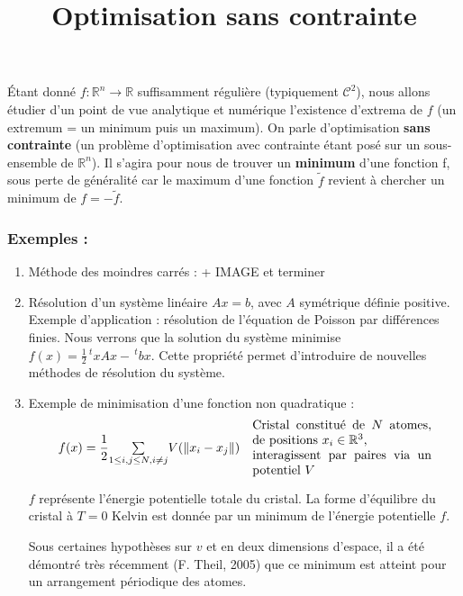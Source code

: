 \documentclass[a4paper,11pt]{article}
\title{\huge \bfseries Optimisation sans contrainte}
\date{}
\author{}
\newcommand{\R}{\mathbb{R}}
\newcommand{\norm}[1]{\left\lVert#1\right\rVert}
\newcommand{\tpo}[1]{\,^t#1}
\theoremstyle{plain} %
\begin{document}
\maketitle

Étant donné $f : \R^n \longrightarrow \R$ suffisamment régulière (typiquement
$\mathcal{C}^2$), nous allons étudier d'un point de vue analytique et
numérique l'existence d'extrema de $f$ (un extremum = un minimum puis un
maximum). On parle d'optimisation \textbf{sans contrainte} (un problème 
d'optimisation avec contrainte étant posé sur un sous-ensemble de $\R^n$).
Il s'agira pour nous de trouver un \textbf{minimum} d'une fonction f, sous perte
de généralité car le maximum d'une fonction $\tilde{f}$ revient à chercher
un minimum de $f = - \tilde{f}$.

\subsubsection*{Exemples :}

\begin{enumerate}[label=-]
    \item Méthode des moindres carrés : 
        + IMAGE
        et terminer

    \item Résolution d'un système linéaire $Ax=b$, avec $A$ symétrique définie
        positive. Exemple d'application : résolution de l'équation de Poisson
        par différences finies. Nous verrons que la solution du système
        minimise $f(x) = \frac{1}{2} \tpo{x}Ax - \tpo{b}x$. Cette propriété
        permet d'introduire de nouvelles méthodes de résolution du système.

    \item Exemple de minimisation d'une fonction non quadratique :
        \[
            \begin{array}{cc}
                f(x) = \dfrac{1}{2} \underset{1\leq i,j\leq N, i\ne j}{\sum} V(\norm{x_i - x_j}) 
                & 
                \parbox{5cm}{Cristal constitué de $N$ atomes, de positions $x_i \in \R^3$,\\ interagissent par paires via un potentiel $V$}
            \end{array}
        \]
        
        $f$ représente l'énergie potentielle totale du cristal. La forme d'équilibre du
        cristal à $T = 0$ Kelvin est donnée par un minimum de l'énergie potentielle $f$.

        Sous certaines hypothèses sur $v$ et en deux dimensions d'espace, il a été démontré
        très récemment (F. Theil, 2005) que ce minimum est atteint pour un arrangement
        périodique des atomes.
\end{enumerate}
\end{document}
